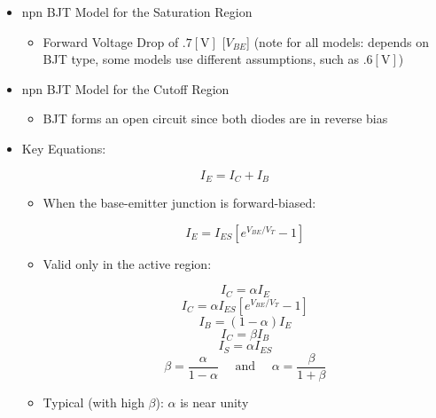 \begin{itemize}
\begin{itemize}
    \end{itemize}

  \item npn BJT Model for the Saturation Region

    \begin{itemize}

      \item Forward Voltage Drop of $.7[\si{\volt}]$ [$V_{BE}$] (note for all models: depends on BJT type, some models use different assumptions, such as $.6[\si{\volt}]$)

    \end{itemize}

  \item npn BJT Model for the Cutoff Region

    \begin{itemize}

      \item BJT forms an open circuit since both diodes are in reverse bias

    \end{itemize}

  \item Key Equations:

    $$I_E=I_C+I_B$$

    \begin{itemize}

      \item When the base-emitter junction is forward-biased:

        $$I_E=I_{ES}[e^{V_{BE}/V_T}-1]$$

      \item Valid only in the active region:

        $$I_C=\alpha I_{E}$$
        $$I_C=\alpha I_{ES}[e^{V_{BE}/V_T}-1]$$
        $$I_B=(1-\alpha)I_E$$
        $$I_C=\beta I_B$$
        $$I_S=\alpha I_{ES}$$
        $$\beta=\frac{\alpha}{1-\alpha}\quad\text{ and }\quad \alpha=\frac{\beta}{1+\beta}$$

      \item Typical (with high $\beta$): $\alpha$ is near unity

    \end{itemize}

\end{itemize}



